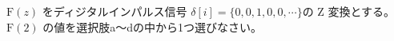 $\textrm{F}(z)$ をディジタルインパルス信号 $\delta[i] = \{0,0,1,0,0,\cdots \}$の Z 変換とする。$\textrm{F}(2)$ の値を選択肢a〜dの中から1つ選びなさい。
